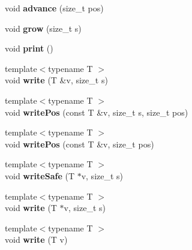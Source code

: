 \begin{DoxyCompactItemize}
void {\bfseries advance} (size\+\_\+t pos)
\item 
\hypertarget{classfaster_1_1fastCommBuffer_a74eaeefb17821823451fcfc2238c6f95}{}\label{classfaster_1_1fastCommBuffer_a74eaeefb17821823451fcfc2238c6f95} 
void {\bfseries grow} (size\+\_\+t s)
\item 
\hypertarget{classfaster_1_1fastCommBuffer_a4dd1d988cd575cb815721b9acc3c30c3}{}\label{classfaster_1_1fastCommBuffer_a4dd1d988cd575cb815721b9acc3c30c3} 
void {\bfseries print} ()
\item 
\hypertarget{classfaster_1_1fastCommBuffer_a3b38d4b6332e864c9f7285961207a8dc}{}\label{classfaster_1_1fastCommBuffer_a3b38d4b6332e864c9f7285961207a8dc} 
{\footnotesize template$<$typename T $>$ }\\void {\bfseries write} (T \&v, size\+\_\+t s)
\item 
\hypertarget{classfaster_1_1fastCommBuffer_a4dc3d8c99ff08b1314fc36c77905dcbf}{}\label{classfaster_1_1fastCommBuffer_a4dc3d8c99ff08b1314fc36c77905dcbf} 
{\footnotesize template$<$typename T $>$ }\\void {\bfseries write\+Pos} (const T \&v, size\+\_\+t s, size\+\_\+t pos)
\item 
\hypertarget{classfaster_1_1fastCommBuffer_addda5fa378a3dfbb4ca1b14405b31c67}{}\label{classfaster_1_1fastCommBuffer_addda5fa378a3dfbb4ca1b14405b31c67} 
{\footnotesize template$<$typename T $>$ }\\void {\bfseries write\+Pos} (const T \&v, size\+\_\+t pos)
\item 
\hypertarget{classfaster_1_1fastCommBuffer_ac47c799234667ff23f5b5ddd699f2ed2}{}\label{classfaster_1_1fastCommBuffer_ac47c799234667ff23f5b5ddd699f2ed2} 
{\footnotesize template$<$typename T $>$ }\\void {\bfseries write\+Safe} (T $\ast$v, size\+\_\+t s)
\item 
\hypertarget{classfaster_1_1fastCommBuffer_a29d46f8bf3c72be5c52d27af129392c5}{}\label{classfaster_1_1fastCommBuffer_a29d46f8bf3c72be5c52d27af129392c5} 
{\footnotesize template$<$typename T $>$ }\\void {\bfseries write} (T $\ast$v, size\+\_\+t s)
\item 
\hypertarget{classfaster_1_1fastCommBuffer_ac70b22b40984e536be908ac6b57c06f1}{}\label{classfaster_1_1fastCommBuffer_ac70b22b40984e536be908ac6b57c06f1} 
{\footnotesize template$<$typename T $>$ }\\void {\bfseries write} (T v)
\item 
\hypertarget{classfaster_1_1fastCommBuffer_a5e472bea93ebc8e55a5c9312ecbd0592}{}\label{classfaster_1_1fastCommBuffer_a5e472bea93ebc8e55a5c9312ecbd0592} 

\end{DoxyCompactItemize}
